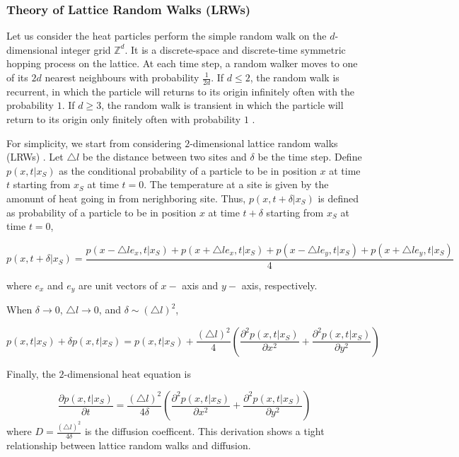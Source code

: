 \subsubsection{Theory of Lattice Random Walks (LRWs)}

Let us consider the heat particles perform the simple random walk on
the $d$-dimensional integer grid $\mathbb{Z}^d$. It is a
discrete-space and discrete-time symmetric hopping process
\cite{redner2001guide} on the lattice. At each time step, a random
walker moves to one of its $2d$ nearest neighbours with probability
$\frac{1}{2d}$. If $d \leq 2$, the random walk is recurrent, in which
the particle will returns to its origin infinitely often with the
probability $1$. If $d \geq 3$, the random walk is transient in which
the particle will return to its origin only finitely often with
probability $1$ \cite{hughes1998random}.


For simplicity, we start from considering $2$-dimensional lattice
random walks (LRWs) \cite{lawler2010random}. Let $\triangle l$ be the
distance between two sites and $\delta$ be the time step. Define $p(x,
t| x_{S})$ as the conditional probability of a particle to be in
position $x$ at time $t$ starting from $x_{S}$ at time $t=0$. The
temperature at a site is given by the amonunt of heat going in from
nerighboring site. Thus, $p(x, t + \delta |x_{S})$ is defined as
probability of a particle to be in position $x$ at time $t + \delta$
starting from $x_{S}$ at time $t=0$,

\begin{equation}
  p(x, t + \delta | x_{S}) = \frac{p(x - \triangle l e_{x}, t| x_{S}) +
    p(x + \triangle l e_{x}, t| x_{S}) + p(x - \triangle l e_{y}, t|
    x_{S}) + p(x + \triangle l e_{y}, t| x_{S})}{4}
\end{equation}

where $e_x$ and $e_y$ are unit vectors of $x-$ axis and $y-$ axis, respectively. 


When $\delta \rightarrow 0$, $\triangle l \rightarrow 0$, and $\delta \sim (\triangle l)^2$, 

\begin{equation}
  p(x, t | x_{S}) + \delta p(x, t | x_{S}) = p(x, t | x_{S}) +
  \frac{(\triangle l)^2}{4} (\frac{\partial ^2 p(x, t|
    x_{S})}{\partial x^2} + \frac{\partial^2 p (x, t| x_{S})}{\partial
    y^2})
\end{equation}

Finally, the $2$-dimensional heat equation is

\begin{equation}
  \frac{\partial p(x, t| x_{S})}{\partial t} = \frac{(\triangle
    l)^2}{4 \delta} (\frac{\partial ^2 p(x, t| x_{S})}{\partial x^2} +
  \frac{\partial^2 p (x, t| x_{S})}{\partial y^2})
\end{equation}
where $D = \frac{(\triangle l)^2}{4 \delta}$ is the diffusion
coefficent. This derivation shows a tight relationship between
lattice random walks and diffusion.


